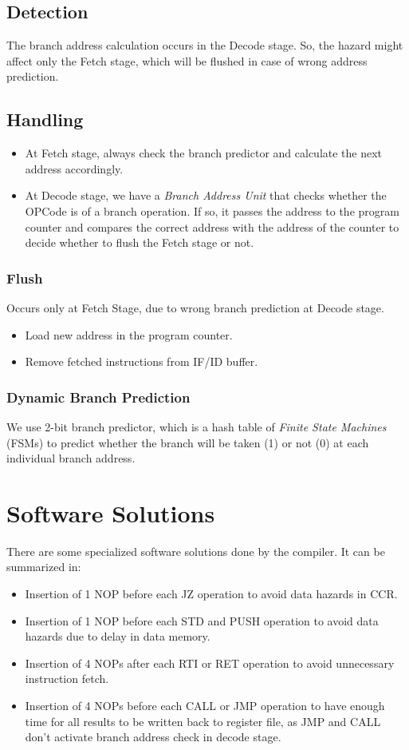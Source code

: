\subsection{Detection}
The branch address calculation occurs in the Decode stage. So, the hazard might affect only the Fetch stage, which will be flushed in case of wrong address prediction.

\subsection{Handling}
\begin{itemize}
    \item At Fetch stage, always check the branch predictor and calculate the next address accordingly.
    \item At Decode stage, we have a \emph{Branch Address Unit} that checks whether the OPCode is of a branch operation. If so, it passes the address to the program counter and compares the correct address with the address of the counter to decide whether to flush the Fetch stage or not. 
\end{itemize}

\subsubsection{Flush}
Occurs only at Fetch Stage, due to wrong branch prediction at Decode stage.
\begin{itemize}
    \item Load new address in the program counter.
    \item Remove fetched instructions from IF/ID buffer.
\end{itemize}

\subsubsection{Dynamic Branch Prediction}
We use 2-bit branch predictor, which is a hash table of \emph{Finite State Machines} (FSMs) to predict whether the branch will be taken (1) or not (0) at each individual branch address.

\section{Software Solutions}
\label{sec:software}

There are some specialized software solutions done by the compiler. It can be summarized in:
\begin{itemize}
    \item Insertion of 1 NOP before each JZ operation to avoid data hazards in CCR.
    \item Insertion of 1 NOP before each STD and PUSH operation to avoid data hazards due to delay in data memory.
    \item Insertion of 4 NOPs after each RTI or RET operation to avoid unnecessary instruction fetch.
    \item Insertion of 4 NOPs before each CALL or JMP operation to have enough time for all results to be written back to register file, as JMP and CALL don't activate branch address check in decode stage.
\end{itemize}